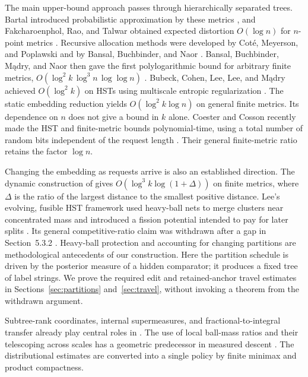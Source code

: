 The main upper-bound approach passes through hierarchically separated
trees. Bartal introduced probabilistic approximation by these
metrics \cite{Bartal96,Bartal98}, and Fakcharoenphol, Rao, and Talwar
obtained expected distortion \(O(\log n)\) for \(n\)-point metrics
\cite{FRT04}. Recursive allocation methods were developed by
Coté, Meyerson, and Poplawski \cite{CMP08} and by Bansal, Buchbinder,
and Naor \cite{BBN10}. Bansal, Buchbinder, Mądry, and Naor then gave
the first polylogarithmic bound for arbitrary finite metrics,
\(O(\log^2 k\,\log^3 n\,\log\log n)\) \cite{BBMN15}.
Bubeck, Cohen, Lee, Lee, and Mądry achieved \(O(\log^2 k)\) on HSTs
using multiscale entropic regularization \cite{BCLLM18}.
The static embedding reduction yields \(O(\log^2 k\log n)\) on
general finite metrics. Its dependence on \(n\) does not give a
bound in \(k\) alone.
Coester and Cosson recently made the HST and finite-metric bounds
polynomial-time, using a total number of random bits independent of the
request length \cite[Theorem~1 and Corollary~2]{CoesterCosson2026}.
Their general finite-metric ratio retains the factor $\log n$.

Changing the embedding as requests arrive is also an established
direction. The dynamic construction of \cite[Section~4]{BCLLM18}
gives \(O(\log^3 k\log(1+\Delta))\) on finite metrics, where
\(\Delta\) is the ratio
of the largest distance to the smallest positive distance.
Lee's evolving, fusible HST framework used heavy-ball nets to merge
clusters near concentrated mass and introduced a fission potential intended
to pay for later splits \cite[Sections~3.1.2--3.2 and~5.3]{Lee18}.
Its general competitive-ratio claim was withdrawn after a gap in
Section~5.3.2 \cite{LeeErratum}. Heavy-ball protection and accounting
for changing partitions are methodological antecedents of our
construction. Here the partition schedule is driven by the posterior
measure of a hidden comparator; it produces a fixed tree of label
strings. We prove the required edit and retained-anchor travel estimates
in Sections~\ref{sec:partitions} and~\ref{sec:travel}, without invoking
a theorem from the withdrawn argument.

Subtree-rank coordinates, internal supermeasures, and
fractional-to-integral transfer already play central roles in
\cite{BBMN15,BCLLM18}. The use of local ball-mass ratios and their
telescoping across scales has a geometric predecessor in measured
descent \cite[Lemma~1.7 and Section~1.3]{KLMN05}.
The distributional estimates are converted into a single policy
by finite minimax and product compactness.



